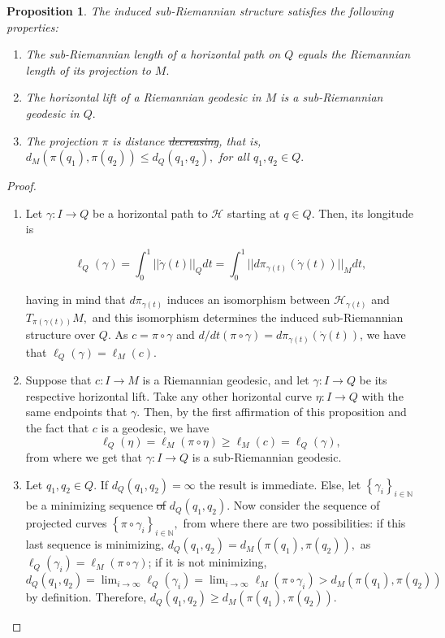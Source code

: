 \documentclass[12pt, letterpaper, reqno]{amsart}
\theoremstyle{definition}
\theoremstyle{plain}
\newtheorem{prop}{Proposition}
\theoremstyle{remark}
\providecommand{\DIFadd}[1]{{\protect\color{blue}\uwave{#1}}} %
\providecommand{\DIFdel}[1]{{\protect\color{red}\sout{#1}}}                      %
\providecommand{\DIFaddbegin}{} %
\providecommand{\DIFaddend}{} %
\providecommand{\DIFdelbegin}{} %
\providecommand{\DIFdelend}{} %
\newcommand{\DIFscaledelfig}{0.5}
\newlength{\DIFdelgraphicswidth} %
\newlength{\DIFdelgraphicsheight} %
\newcommand{\DIFaddincludegraphics}[2][]{{\color{blue}\fbox{\DIFOincludegraphics[#1]{#2}}}} %
\newcommand{\DIFdelincludegraphics}[2][]{%
\sbox{\DIFdelgraphicsbox}{\DIFOincludegraphics[#1]{#2}}%
\settoboxwidth{\DIFdelgraphicswidth}{\DIFdelgraphicsbox} %
\settoboxtotalheight{\DIFdelgraphicsheight}{\DIFdelgraphicsbox} %
\scalebox{\DIFscaledelfig}{%
\parbox[b]{\DIFdelgraphicswidth}{\usebox{\DIFdelgraphicsbox}\\[-\baselineskip] \rule{\DIFdelgraphicswidth}{0em}}\llap{\resizebox{\DIFdelgraphicswidth}{\DIFdelgraphicsheight}{%
\setlength{\unitlength}{\DIFdelgraphicswidth}%
\begin{picture}(1,1)%
\thicklines\linethickness{2pt} %
{\color[rgb]{1,0,0}\put(0,0){\framebox(1,1){}}}%
{\color[rgb]{1,0,0}\put(0,0){\line( 1,1){1}}}%
{\color[rgb]{1,0,0}\put(0,1){\line(1,-1){1}}}%
\end{picture}%
}\hspace*{3pt}}} %
} %
\DeclareRobustCommand{\DIFaddbegin}{\DIFOaddbegin \let\includegraphics\DIFaddincludegraphics} %
\DeclareRobustCommand{\DIFaddend}{\DIFOaddend \let\includegraphics\DIFOincludegraphics} %
\DeclareRobustCommand{\DIFdelbegin}{\DIFOdelbegin \let\includegraphics\DIFdelincludegraphics} %
\DeclareRobustCommand{\DIFdelend}{\DIFOaddend \let\includegraphics\DIFOincludegraphics} %
\begin{document}
\begin{prop}
	The induced sub-Riemannian structure satisfies the following properties:
	\begin{enumerate}
		\item The sub-Riemannian length of a horizontal path on $ Q $ equals the Riemannian length of its projection to $ M. $ 
		\item The horizontal lift of a Riemannian geodesic in $ M $ is a sub-Riemannian geodesic in $ Q. $ 
		\item The projection $ \pi $ is distance \DIFdelbegin \DIFdel{decreasing}\DIFdelend \DIFaddbegin \DIFadd{non-increasing}\DIFaddend , that is, $ d_M(\pi(q_1), \pi(q_2))\leq d_Q(q_1,q_2), $ for all $ q_1,q_2\in Q. $ 
	\end{enumerate}
\end{prop}
\begin{proof}
	\begin{enumerate}
		\item Let $ \gamma: I \rightarrow {Q} $ be a horizontal path to $ \mathcal{H} $ starting at $ q\in Q. $ Then, its longitude is 

		$$\ell_Q(\gamma) = \int_0^1 ||\dot{\gamma} (t) ||_{Q} dt = \int_0^1 || d\pi_{\gamma(t)}(\dot{\gamma}(t))||_M dt,$$ 
		\DIFdelbegin %

\DIFdelend having in mind that $d\pi_{\gamma(t)}$ induces an isomorphism between $ \mathcal{H}_{\gamma(t)} $ and $ T_{\pi(\gamma(t))} M,$ and this isomorphism determines the induced sub-Riemannian structure over $ Q. $ As $c=\pi\circ\gamma$ and $ d/dt(\pi\circ\gamma) = d\pi_{\gamma(t)}(\dot{\gamma}(t)) $, we have that $ \ell_Q(\gamma)=\ell_M(c). $  

		\item Suppose that $ c: I \rightarrow {M} $ is a Riemannian geodesic, and let $ \gamma: I \rightarrow {Q} $ be its respective horizontal lift. Take any other horizontal curve $ \eta: I \rightarrow {Q} $ with the same endpoints that $ \gamma. $ Then, by the first affirmation of this proposition and the fact that $ c $ is a geodesic, we have
			$$ \ell_Q(\eta) = \ell_M(\pi\circ \eta) \geq \ell_M(c) = \ell_Q(\gamma),  $$ 
		from where we get that $ \gamma: I \rightarrow {Q} $ is a sub-Riemannian geodesic.

	\item Let $ q_1,q_2\in Q. $ If $ d_Q(q_1,q_2) = \infty $ the result is immediate. Else, let $ \left\{ \gamma_i \right\}_{i\in \mathbb{N}} $ be a minimizing sequence \DIFdelbegin \DIFdel{of }\DIFdelend \DIFaddbegin \DIFadd{for }\DIFaddend $ d_Q(q_1,q_2). $ Now consider the sequence of projected curves $ \left\{ \pi\circ\gamma_i \right\}_{i\in \mathbb{N}}, $ from where there are two possibilities: if this last sequence is minimizing, $ d_Q(q_1, q_2) = d_M(\pi(q_1), \pi(q_2)),$ as $ \ell_Q(\gamma_i)=\ell_M(\pi\circ\gamma) $;  if it is not minimizing,  $d_Q(q_1,q_2) = \lim_{i \rightarrow \infty} \ell_Q(\gamma_i) = \lim_{i \rightarrow \infty} \ell_M(\pi\circ\gamma_i) > d_M(\pi(q_1),\pi(q_2))$ by definition. Therefore, $ d_Q(q_1,q_2)\geq d_M(\pi(q_1),\pi(q_2)).$
	\end{enumerate}
\end{proof}
\end{document}
